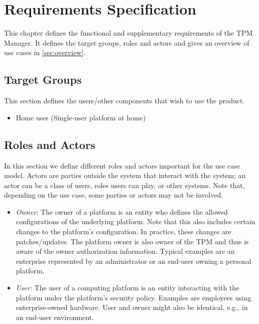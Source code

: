 \documentclass[
  american        %
]{sirrixreport}
\begin{document}
\chapter{Requirements Specification}
\label{chap:requirements}
This chapter defines the functional and supplementary requirements of the TPM Manager. It defines the target groups, roles and actors and gives an overview of use cases in \autoref{sec:overview}.


\section{Target Groups}
 This section defines the users/other components that wish to use the product.

\begin{itemize}
 \item Home user (Single-user platform at home)
\end{itemize}

\section{Roles and Actors}
 In this section we define different roles and actors important for the use case model. Actors are parties outside the system that interact with the system; an actor can be a class of users, roles users can play, or other systems. Note that, depending on the use case, some parties or actors may not be involved.

\begin{itemize}
 \item \emph{Owner:} The owner of a platform is an entity who defines the allowed configurations of the underlying platform. Note that this also includes certain changes to the platform's configuration.  In practice, these changes are patches/updates. The platform owner is also owner of the TPM and thus is aware of the owner authorization information. Typical examples are an enterprise represented by an administrator or an end-user owning a personal platform.
 \item \emph{User:} The user of a computing platform is an entity interacting with the platform under the platform's security policy. Examples are employees using enterprise-owned hardware. User and owner might also be identical, e.g., in an end-user environment.
\end{itemize}
\end{document}
